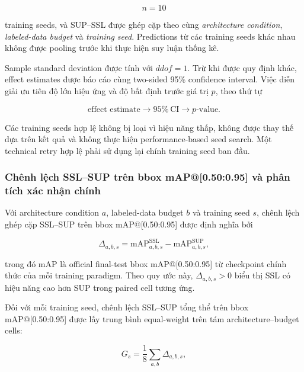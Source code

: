 \documentclass[pdflatex,sn-mathphys-num]{sn-jnl}%
\theoremstyle{thmstyleone}%
\theoremstyle{thmstyletwo}%
\theoremstyle{thmstylethree}%
\begin{document}
\begin{equation}
n=10
\end{equation}

training seeds, và SUP--SSL được ghép cặp theo cùng
\textit{architecture condition}, \textit{labeled-data budget} và
\textit{training seed}. Predictions từ các training seeds khác nhau không
được pooling trước khi thực hiện suy luận thống kê.

Sample standard deviation được tính với \(ddof=1\). Trừ khi được quy định
khác, effect estimates được báo cáo cùng two-sided 95\% confidence interval.
Việc diễn giải ưu tiên độ lớn hiệu ứng và độ bất định trước giá trị
\(p\), theo thứ tự

\begin{equation}
\text{effect estimate}
\longrightarrow
95\%~\mathrm{CI}
\longrightarrow
p\text{-value}.
\label{eq:statistical_reporting_order}
\end{equation}

Các training seeds hợp lệ không bị loại vì hiệu năng thấp, không được thay
thế dựa trên kết quả và không thực hiện performance-based seed search. Một
technical retry hợp lệ phải sử dụng lại chính training seed ban đầu.

\subsubsection{Chênh lệch SSL--SUP trên bbox mAP@[0.50:0.95] và phân tích xác nhận chính}
\label{subsubsec:primary_ssl_sup_analysis}

Với architecture condition \(a\), labeled-data budget \(b\) và training
seed \(s\), chênh lệch ghép cặp SSL--SUP trên bbox mAP@[0.50:0.95] được định nghĩa bởi

\begin{equation}
\Delta_{a,b,s}
=
\mathrm{mAP}^{\mathrm{SSL}}_{a,b,s}
-
\mathrm{mAP}^{\mathrm{SUP}}_{a,b,s},
\label{eq:paired_delta_map}
\end{equation}

trong đó mAP là official final-test bbox mAP@[0.50:0.95] từ checkpoint
chính thức của mỗi training paradigm. Theo quy ước này,
\(\Delta_{a,b,s}>0\) biểu thị SSL có hiệu năng cao hơn SUP trong paired
cell tương ứng.

Đối với mỗi training seed, chênh lệch SSL--SUP tổng thể trên bbox mAP@[0.50:0.95] được lấy trung bình
equal-weight trên tám architecture--budget cells:

\begin{equation}
G_s
=
\frac{1}{8}
\sum_{a,b}
\Delta_{a,b,s},
\label{eq:overall_seed_ssl_gain}
\end{equation}
\end{document}
